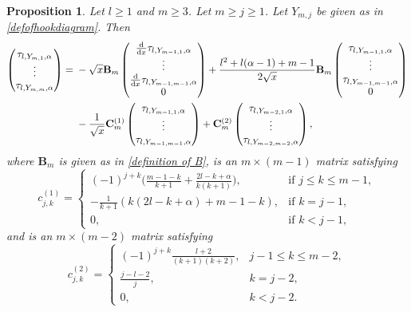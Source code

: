 \documentclass[pdftex]{sigma}
\numberwithin{equation}{section}
\newtheorem{Proposition}[Theorem]{Proposition}
\theoremstyle{definition}
\begin{document}
\begin{Proposition}
\label{recursive formula for tau0}
Let $l\geq 1$ and $m\geq 3$. Let $m\geq j\geq 1$. Let $Y_{m,j}$ be given as in \eqref{defofhookdiagram}.
Then
\begin{align}
\begin{pmatrix}
\tau_{l,Y_{m,1},\alpha} \\
\vdots \\
\tau_{l,Y_{m,m},\alpha}
\end{pmatrix}
={}&
- \sqrt{x} \mathbf B_{m}
\begin{pmatrix}
\frac{\rm d}{{\rm d}x} \tau_{l,Y_{m-1,1},\alpha} \\
\vdots \\
\frac{\rm d}{{\rm d}x}\tau_{l,Y_{m-1,m-1},\alpha} \\
0
\end{pmatrix}
+\frac{l^2+l(\alpha-1)+m-1}{2\sqrt{x}} \mathbf B_{m}\begin{pmatrix}
 \tau_{l,Y_{m-1,1},\alpha} \\
\vdots \\
\tau_{l,Y_{m-1,m-1},\alpha} \\
0
\end{pmatrix} \nonumber\\
& - \frac{1}{\sqrt{x}} \mathbf C^{(1)}_{m}
\begin{pmatrix}
 \tau_{l,Y_{m-1,1},\alpha} \\
\vdots \\
\tau_{l,Y_{m-1,m-1},\alpha}
\end{pmatrix}
+ \mathbf C^{(2)}_{m}
\begin{pmatrix}
 \tau_{l,Y_{m-2,1},\alpha} \\
\vdots \\
\tau_{l,Y_{m-2,m-2},\alpha}
\end{pmatrix},\label{recursiveprocess}
\end{align}
where $\mathbf B_{m}$ is given as in \eqref{definition of B},  {is} an $m \times (m-1)$ matrix satisfying
\[%
c_{j,k}^{(1)}=
\begin{cases}
(-1)^{j+k}\bigl(\frac{m-1-k}{k+1}+\frac{2l-k+\alpha}{k(k+1)}\bigr) ,& \text{if } j\leq k\leq m-1,\\
 -\frac{1}{k+1}(k(2l-k+\alpha)+m-1-k),& \text{if } k=j-1, \\
 0, & \text{if } k<j-1,
\end{cases}
\] and
 is an $m\times (m-2)$ matrix satisfying
\[%
c_{j,k}^{(2)} =
\begin{cases}
 (-1)^{j+k} \frac{l+2}{(k+1)(k+2)}, & j-1\leq k \leq m-2, \\
\frac{j-l-2}{j}, & k=j-2, \\
 0 ,& k<j-2.
\end{cases}
\]
\end{Proposition}
\end{document}
